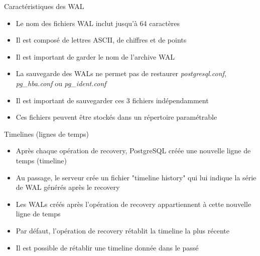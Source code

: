 
\begin{frame}[fragile]{Caractéristiques des WAL}

\begin{itemize}

   \item Le nom des fichiers WAL inclut jusqu'à 64 caractères
   \item Il est composé de lettres ASCII, de chiffres et de points
   \item Il est important de garder le nom de l'archive WAL
   \item La sauvegarde des WALs ne permet pas de restaurer \textit{postgresql.conf}, \textit{pg\_hba.conf} ou \textit{pg\_ident.conf}
   \item Il est important de sauvegarder ces 3 fichiers indépendamment
   \item Ces fichiers peuvent être stockés dans un répertoire paramétrable

\end{itemize}

\end{frame}


\begin{frame}[fragile]{Timelines (lignes de temps)}

\begin{itemize}

   \item Après chaque opération de recovery, PostgreSQL créée une nouvelle ligne de temps (timeline)
   \item Au passage, le serveur crée un fichier "timeline history" qui lui indique la série de WAL générés après le recovery
   \item Les WALs créés après l'opération de recovery appartiennent à cette nouvelle ligne de temps
   \item Par défaut, l'opération de recovery rétablit la timeline la plus récente
   \item Il est possible de rétablir une timeline donnée dans le passé


\end{itemize}

\begin{toile}
\end{toile}

\end{frame}



